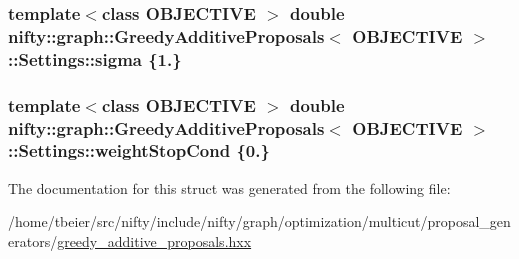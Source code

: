 \subsubsection[{sigma}]{\setlength{\rightskip}{0pt plus 5cm}template$<$class O\+B\+J\+E\+C\+T\+I\+V\+E $>$ double {\bf nifty\+::graph\+::\+Greedy\+Additive\+Proposals}$<$ O\+B\+J\+E\+C\+T\+I\+V\+E $>$\+::Settings\+::sigma \{1.\}}\label{structnifty_1_1graph_1_1GreedyAdditiveProposals_1_1Settings_a469ca037db03bbe6d6d1e6234e1d6e2f}
\hypertarget{structnifty_1_1graph_1_1GreedyAdditiveProposals_1_1Settings_a0d0986525d84eb607bd46ff4fe44fbee}{}
\subsubsection[{weight\+Stop\+Cond}]{\setlength{\rightskip}{0pt plus 5cm}template$<$class O\+B\+J\+E\+C\+T\+I\+V\+E $>$ double {\bf nifty\+::graph\+::\+Greedy\+Additive\+Proposals}$<$ O\+B\+J\+E\+C\+T\+I\+V\+E $>$\+::Settings\+::weight\+Stop\+Cond \{0.\}}\label{structnifty_1_1graph_1_1GreedyAdditiveProposals_1_1Settings_a0d0986525d84eb607bd46ff4fe44fbee}


The documentation for this struct was generated from the following file\+:\begin{DoxyCompactItemize}
\item 
/home/tbeier/src/nifty/include/nifty/graph/optimization/multicut/proposal\+\_\+generators/\hyperlink{greedy__additive__proposals_8hxx}{greedy\+\_\+additive\+\_\+proposals.\+hxx}\end{DoxyCompactItemize}
